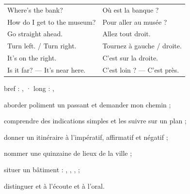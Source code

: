 \begin{essentiel}
\begin{minipage}[t]{0.57\linewidth}
\renewcommand{\arraystretch}{1.32}
\begin{tabular}{@{}>{\enOn\otSemi\fontsize{9.4}{11}\selectfont}l<{\enOff}@{\hspace{3mm}}>{\fontsize{9.2}{11}\selectfont\color{white!78!otNavy}}l@{}}
Where's the bank?              & Où est la banque ?\\
How do I get to the museum?    & Pour aller au musée ?\\
Go straight ahead.             & Allez tout droit.\\
Turn left. / Turn right.       & Tournez à gauche / droite.\\
It's on the right.             & C'est sur la droite.\\
Is it far? — It's near here.   & C'est loin ? — C'est près.\\
\end{tabular}
\end{minipage}\hfill
\begin{minipage}[t]{0.38\linewidth}
{\par}
{\par}
{\fontsize{9.2}{11.6}\selectfont {} bref : ,  ·  long : , \par}
\end{minipage}
\end{essentiel}

\begin{jesais}
\item aborder poliment un passant et demander mon chemin ;
\item comprendre des indications simples et les suivre sur un plan ;
\item donner un itinéraire à l'impératif, affirmatif et négatif ;
\item nommer une quinzaine de lieux de la ville ;
\item situer un bâtiment : , , ,  ;
\item distinguer  et  à l'écoute et à l'oral.
\end{jesais}

